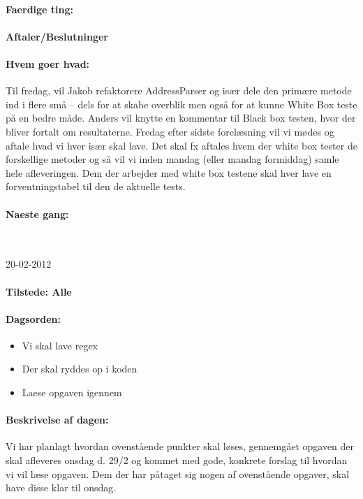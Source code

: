 \documentclass[a4paper,10pt,titlepage]{article}
\begin{document}
			\paragraph{Faerdige ting:}
			
			\paragraph{Aftaler/Beslutninger}
			
			\paragraph{Hvem goer hvad:}
			Til fredag, vil Jakob refaktorere AddressParser og især dele den primære metode ind i flere små – dels for at skabe overblik men også for at kunne White Box teste på en bedre måde.
Anders vil knytte en kommentar til Black box testen, hvor der bliver fortalt om resultaterne.
Fredag efter sidste forelæsning vil vi mødes og aftale hvad vi hver især skal lave. Det skal fx aftales hvem der white box tester de forskellige metoder og så vil vi inden mandag (eller mandag formiddag) samle hele afleveringen.
Dem der arbejder med white box testene skal hver lave en forventningstabel til den de aktuelle tests.

			\paragraph{Naeste gang:}\mbox{}\\
			
			\begin{center}
		20-02-2012
		\end{center}
		\paragraph{Tilstede: Alle}
		\paragraph{Dagsorden:}
		\begin{itemize}
					\item Vi skal lave regex 
					\item Der skal ryddes op i koden
					\item Laese opgaven igennem
					 
		\end{itemize}
		
		\paragraph{Beskrivelse af dagen:}
		Vi har planlagt hvordan ovenstående punkter skal løses, gennemgået opgaven der skal afleveres onsdag d. 29/2 og kommet med gode, konkrete forslag til hvordan vi vil læse opgaven.
Dem der har påtaget sig nogen af ovenstående opgaver, skal have disse klar til onsdag.
\end{document}

